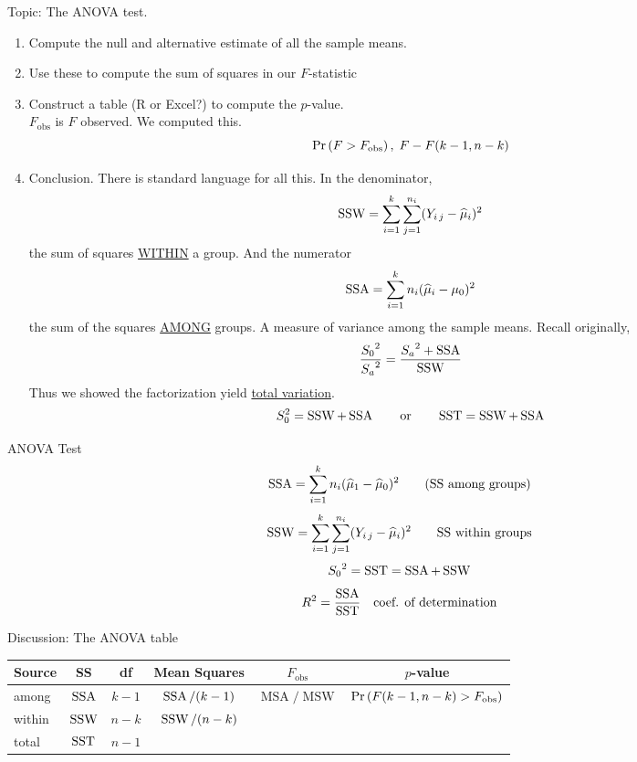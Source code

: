 \nl Topic: The ANOVA test.
\begin{enumerate}[label=\textcircled{\raisebox{-1pt}{\arabic*}}]
    \item Compute the null and alternative estimate of all the sample means.
    \item Use these to compute the sum of squares in our $F$-statistic
    \item Construct a table (R or Excel?) to compute the $p$-value.\\$F_{\text{obs}}$ is $F$ observed. We computed this.
    $$\P{F > F_{\text{obs}}},\; F - F(k-1,n-k)$$
    \item Conclusion. There is standard language for all this. In the denominator,
    $$\operatorname{SSW} = \sum_{i=1}^k \sum_{j=1}^{n_i} (Y_{i\,j} - \widehat{\mu}_i)^2$$
    the sum of squares \underline{WITHIN} a group. And the numerator
    $$\operatorname{SSA} = \sum_{i=1}^k n_i (\widehat{\mu}_i - \mu_0)^2$$
    the sum of the squares \underline{AMONG} groups. A measure of variance among the sample means. Recall originally,
    $$\frac{{S_0}^2}{{S_a}^2} = \frac{{S_a}^2 + \operatorname{SSA}}{\operatorname{SSW}}$$
    Thus we showed the factorization yield \underline{total variation}.
    $$S_{0}^2 = \operatorname{SSW} + \operatorname{SSA} \qquad \text{or} \qquad \operatorname{SST} = \operatorname{SSW} + \operatorname{SSA}$$
\end{enumerate}

\nnl ANOVA Test
$$\operatorname{SSA} = \sum_{i=1}^k n_i (\widehat{\mu}_1 - \widehat{\mu}_0)^2 \qquad \text{(SS among groups)}$$
$$\operatorname{SSW} = \sum_{i=1}^k \sum_{j=1}^{n_i} (Y_{i\,j} - \widehat{\mu}_i)^2 \qquad \text{SS within groups}$$
$${S_0}^2 = \operatorname{SST} = \operatorname{SSA} + \operatorname{SSW}$$
$$R^2 = \frac{\operatorname{SSA}}{\operatorname{SST}} \quad \text{coef. of determination}$$

\nl Discussion: The ANOVA table

  \begin{center}
    \begin{tabular}{|l|c c c c c|}
         \hline
         Source & SS & df & Mean Squares & $F_{\text{obs}}$ & $p$-value\\
         \hline
         among & $\operatorname{SSA}$ & $k-1$ & $\operatorname{SSA}/(k-1)$ & $\operatorname{MSA}/\operatorname{MSW}$ & $\P{F(k-1, n-k) > F_{\text{obs}}}$ \\
         within & $\operatorname{SSW}$ & $n-k$ & $\operatorname{SSW}/(n-k)$ & & \\
         total & $\operatorname{SST}$ & $n-1$ & & &\\
         \hline
    \end{tabular}
\end{center}

